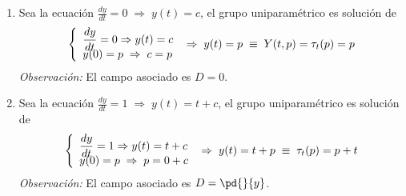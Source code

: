     \begin{ejes} \: 
        \begin{enumerate}
            \item Sea la ecuación $\frac{dy}{dt}=0 \; \Rightarrow \; y(t)=c$, el grupo uniparamétrico es solución de
             $$\left\{ \begin{array}{l}
              \dfrac{dy}{dt} = 0 \Rightarrow y(t)=c\\
              \vspace{-5mm} \\
             y(0)=p \; \Rightarrow \; c=p 
\end{array} \right. \; \Rightarrow \; y(t)=p  \; \equiv \; Y(t,p)=\tau_t(p)=p$$
\textit{Observación:} El campo asociado es $D=0$.
            \item Sea la ecuación $\frac{dy}{dt}=1 \; \Rightarrow \; y(t)=t+c$, el grupo uniparamétrico es solución de
             $$\left\{ \begin{array}{l}
              \dfrac{dy}{dt} = 1 \Rightarrow y(t)=t+c\\
              \vspace{-5mm} \\
             y(0)=p \; \Rightarrow \; p=0+c 
\end{array} \right. \; \Rightarrow \; y(t)=t+p  \; \equiv \; \tau_t(p)=p+t$$
\textit{Observación:} El campo asociado es $D=\pd{}{y}$.
 

\end{enumerate}
\end{ejes}
